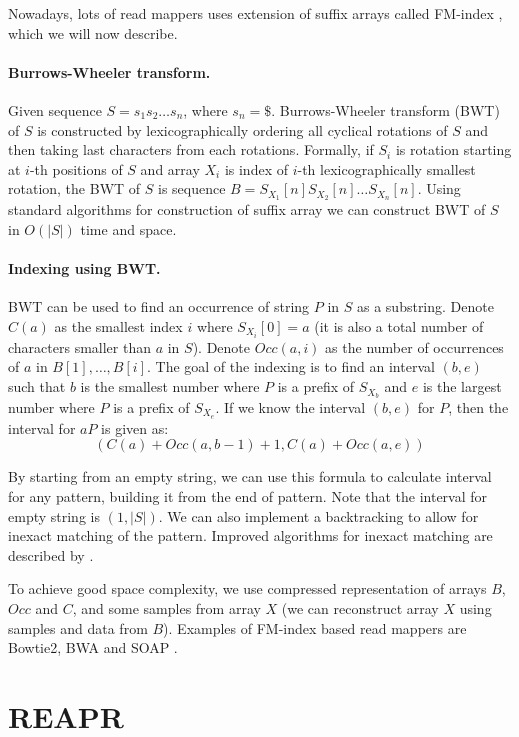 Nowadays, lots of read mappers uses extension of suffix arrays called FM-index
\citep{fmindex, fmindex2}, which we will now describe.

\paragraph{Burrows-Wheeler transform.} Given sequence $S = s_1 s_2 \dots s_n$, where
$s_n = \$$. Burrows-Wheeler transform (BWT) of $S$ is constructed
by lexicographically ordering all cyclical rotations of $S$ and then
taking last characters from each rotations.
Formally, if $S_i$ is rotation starting at $i$-th positions of $S$ and array
$X_i$ is index of $i$-th lexicographically smallest rotation, the
BWT of $S$ is sequence $B = S_{X_1}[n] S_{X_2}[n] \dots S_{X_n}[n]$.
Using standard algorithms for construction of suffix array we
can construct BWT of $S$ in $O(|S|)$ time and space.

\paragraph{Indexing using BWT.}
BWT can be used to find an occurrence of string $P$ in $S$ as a substring.
Denote $C(a)$ as the smallest index $i$ where $S_{X_i}[0] = a$ (it is also
a total number of characters smaller than $a$ in $S$).
Denote $Occ(a,i)$ as the number of occurrences of $a$ in $B[1], \dots, B[i]$.
The goal of the indexing is to find an interval $(b, e)$ such that
$b$ is the smallest number where $P$ is a prefix of $S_{X_b}$
and $e$ is the largest number where $P$ is a prefix of $S_{X_e}$.
If we know the interval $(b, e)$ for $P$, then the interval for
$aP$ is given as:
$$(C(a) + Occ(a, b - 1) + 1, C(a) + Occ(a, e))$$

By starting from an empty string, we can use
this formula to calculate interval for any pattern, building
it from the end of pattern. Note that
the interval for empty string is $(1, |S|)$.
We can also implement
a backtracking to allow for inexact matching of the pattern. 
Improved algorithms for inexact matching are described by \citet{fmindex3}.

To achieve good space complexity, we use compressed representation
of arrays $B$, $Occ$ and $C$, and some samples from array $X$ (we can reconstruct
array $X$ using samples and data from $B$). 
Examples of FM-index based read mappers are Bowtie2, BWA and SOAP
\citep{bowtie2,fmindex,soap}.

\section{REAPR}


